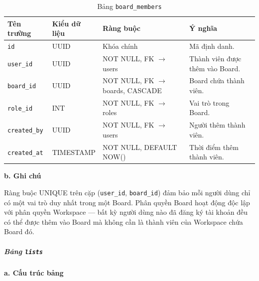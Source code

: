 \begin{table}[H]
\centering
\begin{tabular}{|p{3cm}|p{3.5cm}|p{3.5cm}|p{4cm}|}
\hline
\textbf{Tên trường} & \textbf{Kiểu dữ liệu} & \textbf{Ràng buộc} & \textbf{Ý nghĩa} \\
\hline
\texttt{id} & UUID & Khóa chính & Mã định danh. \\
\hline
\texttt{user\_id} & UUID & NOT NULL, FK $\rightarrow$ users & Thành viên được thêm vào Board. \\
\hline
\texttt{board\_id} & UUID & NOT NULL, FK $\rightarrow$ boards, CASCADE & Board chứa thành viên. \\
\hline
\texttt{role\_id} & INT & NOT NULL, FK $\rightarrow$ roles & Vai trò trong Board. \\
\hline
\texttt{created\_by} & UUID & NOT NULL, FK $\rightarrow$ users & Người thêm thành viên. \\
\hline
\texttt{created\_at} & TIMESTAMP & NOT NULL, DEFAULT NOW() & Thời điểm thêm thành viên. \\
\hline
\end{tabular}
\caption{Bảng \texttt{board\_members}}
\label{tab:db_board_members}
\end{table}

\hspace{1.5em}\textbf{b. Ghi chú}

Ràng buộc UNIQUE trên cặp (\texttt{user\_id}, \texttt{board\_id}) đảm bảo mỗi người dùng chỉ có một vai trò duy nhất trong một Board. Phân quyền Board hoạt động độc lập với phân quyền Workspace — bất kỳ người dùng nào đã đăng ký tài khoản đều có thể được thêm vào Board mà không cần là thành viên của Workspace chứa Board đó.


\subparagraph{Bảng \texttt{lists}} \mbox{}

\hspace{1.5em}\textbf{a. Cấu trúc bảng}

